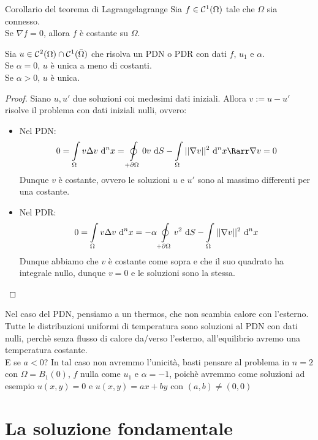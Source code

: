\documentclass{book}
\begin{document}
\begin{lemma}{Corollario del teorema di Lagrange}{lagrange}
    Sia $f\in\mathcal{C}^1(\Omega)$ tale che $\Omega$ sia connesso.\\
    Se $\nabla f = 0$, allora $f$ è costante su $\Omega$.
\end{lemma}

\begin{theorem}{}{}
    Sia $u \in \mathcal{C}^2(\Omega)\cap\mathcal{C}^1(\bar{\Omega})$ che risolva un PDN o PDR con dati $f$, $u_1$ e $\alpha$.\\
    Se $\alpha=0$, $u$ è unica a meno di costanti.\\
    Se $\alpha>0$, $u$ è unica.
\end{theorem}

\begin{proof}
    Siano $u,u'$ due soluzioni coi medesimi dati iniziali. Allora $v := u-u'$ risolve il problema con dati iniziali nulli, ovvero:\begin{itemize}
        \item Nel PDN:
        \[0 = \int\limits_\Omega v\Delta v \de^n x = \oint\limits_{+\partial\Omega} 0 v\de S - \int\limits_\Omega ||\nabla v||^2 \de^n x \Rarr \nabla v = 0\] Dunque $v$ è costante, ovvero le soluzioni $u$ e $u'$ sono al massimo differenti per una costante.
        \item Nel PDR:
        \[0 = \int\limits_\Omega v\Delta v \text{ d}^n x = -\alpha \oint\limits_{+\partial\Omega} v^2 \text{ d} S - \int\limits_\Omega ||\nabla v||^2 \text{ d}^n x\] Dunque abbiamo che $v$ è costante come sopra e che il suo quadrato ha integrale nullo, dunque $v=0$ e le soluzioni sono la stessa.
    \end{itemize}
\end{proof}

\begin{remark}{}{}
    Nel caso del PDN, pensiamo a un thermos, che non scambia calore con l'esterno. Tutte le distribuzioni uniformi di temperatura sono soluzioni al PDN con dati nulli, perchè senza flusso di calore da/verso l'esterno, all'equilibrio avremo una temperatura costante.\\
    E se $a<0$? In tal caso non avremmo l'unicità, basti pensare al problema in $n=2$ con $\Omega = B_1(0)$, $f$ nulla come $u_1$ e $\alpha = -1$, poichè avremmo come soluzioni ad esempio $u(x,y)=0$ e $u(x,y) = ax+by$ con $(a,b)\neq(0,0)$
\end{remark}

\section{La soluzione fondamentale}
\end{document}
